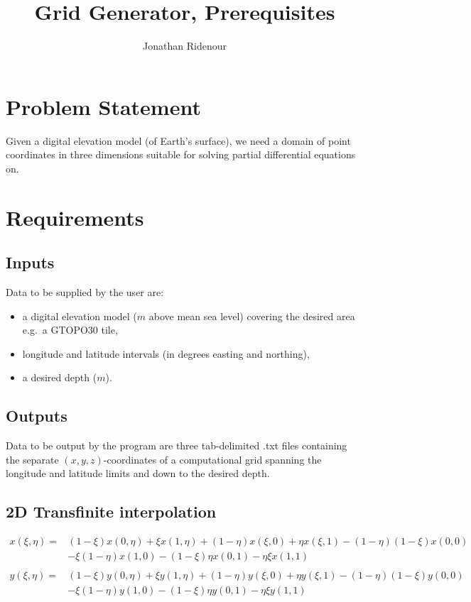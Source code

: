 \documentclass{article}
\title{Grid Generator, Prerequisites\\
}
\author{Jonathan Ridenour}
\newcommand{\ba}[1]{\begin{align*}    #1    \end{align*}}
\begin{document}
\maketitle

\section*{Problem Statement}
Given a digital elevation model (of Earth's surface), we need a domain of point coordinates in three dimensions suitable for solving partial differential equations on.

\section*{Requirements}

\subsection*{Inputs}
Data to be supplied by the user are: 
\begin{itemize}
\item a digital elevation model ($m$ above mean sea level) covering the desired area e.g.\ a GTOPO30 tile, 
\item longitude and latitude intervals (in degrees easting and northing),
\item a desired depth ($m$).
\end{itemize}

\subsection*{Outputs}
Data to be output by the program are three tab-delimited .txt files containing the separate $(x, y, z)$-coordinates of a computational grid spanning the longitude and latitude limits and down to the desired depth.

\subsection*{2D Transfinite interpolation}
\ba{
x(\xi,\eta) = &(1-\xi)x(0,\eta)+\xi x(1,\eta)+(1-\eta)x(\xi,0)+\eta x(\xi,1)-(1-\eta)(1-\xi)x(0,0)
\\&-\xi(1-\eta)x(1,0)-(1-\xi)\eta x(0,1)-\eta \xi x(1,1)\\
\\y(\xi, \eta) = &(1-\xi)y(0,\eta)+\xi y(1,\eta)+(1-\eta)y(\xi,0)+\eta y(\xi,1)-(1-\eta)(1-\xi)y(0,0)
\\&-\xi(1-\eta)y(1,0)-(1-\xi)\eta y(0,1)-\eta \xi y(1,1)
}
\end{document}

